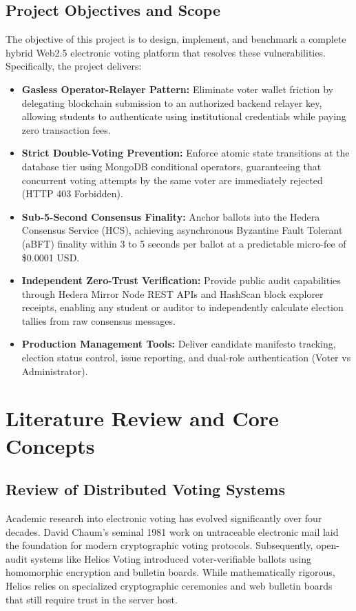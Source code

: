 \documentclass[12pt, a4paper]{article}
\begin{document}
\subsection{Project Objectives and Scope}
The objective of this project is to design, implement, and benchmark a complete hybrid Web2.5 electronic voting platform that resolves these vulnerabilities. Specifically, the project delivers:
\begin{itemize}[leftmargin=*]
    \item \textbf{Gasless Operator-Relayer Pattern:} Eliminate voter wallet friction by delegating blockchain submission to an authorized backend relayer key, allowing students to authenticate using institutional credentials while paying zero transaction fees.
    \item \textbf{Strict Double-Voting Prevention:} Enforce atomic state transitions at the database tier using MongoDB conditional operators, guaranteeing that concurrent voting attempts by the same voter are immediately rejected (HTTP 403 Forbidden).
    \item \textbf{Sub-5-Second Consensus Finality:} Anchor ballots into the Hedera Consensus Service (HCS), achieving asynchronous Byzantine Fault Tolerant (aBFT) finality within 3 to 5 seconds per ballot at a predictable micro-fee of \$0.0001 USD.
    \item \textbf{Independent Zero-Trust Verification:} Provide public audit capabilities through Hedera Mirror Node REST APIs and HashScan block explorer receipts, enabling any student or auditor to independently calculate election tallies from raw consensus messages.
    \item \textbf{Production Management Tools:} Deliver candidate manifesto tracking, election status control, issue reporting, and dual-role authentication (Voter vs Administrator).
\end{itemize}

\section{Literature Review and Core Concepts}

\subsection{Review of Distributed Voting Systems}
Academic research into electronic voting has evolved significantly over four decades. David Chaum's seminal 1981 work on untraceable electronic mail laid the foundation for modern cryptographic voting protocols. Subsequently, open-audit systems like Helios Voting introduced voter-verifiable ballots using homomorphic encryption and bulletin boards. While mathematically rigorous, Helios relies on specialized cryptographic ceremonies and web bulletin boards that still require trust in the server host.
\end{document}
